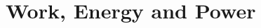 \documentclass{article}
\begin{document}
\setcounter{section}{9}
\section{Work, Energy and Power}




\end{document}
